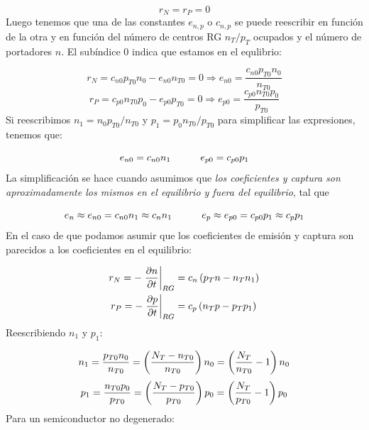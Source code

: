 \begin{equation}
	r_N = r_P = 0
\end{equation}
Luego tenemos que una de las constantes $e_{n,p}$ o $c_{n,p}$ se puede reescribir en función de la otra y en función del número de centros RG $n_T/p_T$ ocupados y el número de portadores $n$. El subíndice $0$ indica que estamos en el equlibrio:

\begin{equation}
	r_N = c_{n0} p_{T0} n_0 - e_{n0} n_{T0} = 0 \Rightarrow e_{n0} = \frac{c_{n0} p_{T0}n_0}{n_{T0}}
\end{equation}
\begin{equation}
	r_P = c_{p0} n_{T0} p_0 - e_{p0} p_{T0} = 0 \Rightarrow e_{p0} = \frac{c_{p0} n_{T0} p_0 }{p_{T0}}
\end{equation}
Si reescribimos $n_1=n_0p_{T0}/n_{T0}$ y $p_1=p_0n_{T0}/p_{T0}$ para simplificar las expresiones, tenemos que:

\begin{equation}
	e_{n0} = c_{n0} n_1 \quad \quad \quad e_{p0} = c_{p0} p_1
\end{equation}
La simplificación se hace cuando asumimos que \textit{los coeficientes y captura son aproximadamente los mismos en el equilibrio y fuera del equilibrio}, tal que

\begin{equation}
	e_n\approx e_{n0} = c_{n0} n_1 \approx c_n n_1 \quad \quad \quad
	e_p\approx e_{p0} = c_{p0} p_1 \approx c_p p_1
\end{equation}
En el caso de que podamos asumir que los coeficientes de emisión y captura son parecidos a los coeficientes en el equilibrio:

\begin{equation}
	\begin{split}
		r_N = - \eval{\parciales{n}{t}}_{{RG}} & = c_n \parentesis{p_T n - n_T n_1} \\
		r_P = -  \eval{\parciales{p}{t}}_{RG}    & = c_p \parentesis{n_T p - p_T p_1}
	\end{split}
\end{equation}
Reescribiendo $n_1$ y $p_1$:

\begin{equation}
	n_1 = \frac{p_{T0} n_0}{n_{T0}} = \left( \frac{N_T-n_{T0}}{n_{T0}} \right) n_0 = \left( \frac{N_T}{n_{T0}}-1 \right) n_0
\end{equation}
\begin{equation}
	p_1 = \frac{n_{T0}p_0}{p_{T0}} = \left( \frac{N_T-p_{T0}}{p_{T0}} \right) p_0 = \left( \frac{N_T}{p_{T0}}-1 \right) p_0
\end{equation}
Para un semiconductor no degenerado:

